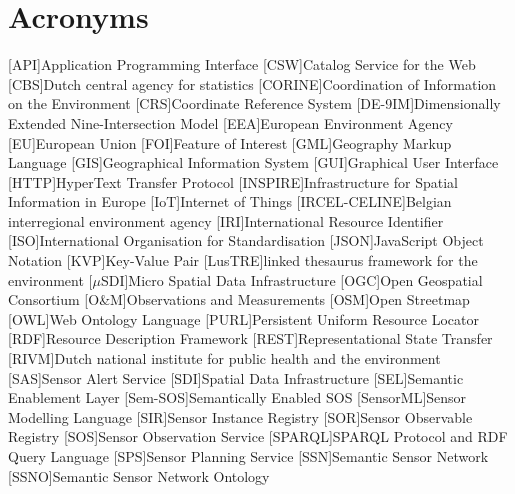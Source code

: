 \chapter*{Acronyms}

\begin{acronym}[UML]
  [API]{Application Programming Interface}
  [CSW]{Catalog Service for the Web}
  [CBS]{Dutch central agency for statistics}
  [CORINE]{Coordination of Information on the Environment} 
  [CRS]{Coordinate Reference System} 
  [DE-9IM]{Dimensionally Extended Nine-Intersection Model}
  [EEA]{European Environment Agency}
  [EU]{European Union}
  [FOI]{Feature of Interest}
  [GML]{Geography Markup Language}
  [GIS]{Geographical Information System}
  [GUI]{Graphical User Interface}
  [HTTP]{HyperText Transfer Protocol}
  [INSPIRE]{Infrastructure for Spatial Information in Europe}
  [IoT]{Internet of Things}
  [IRCEL-CELINE]{Belgian interregional environment agency}
  [IRI]{International Resource Identifier}
  [ISO]{International Organisation for Standardisation}
  [JSON]{JavaScript Object Notation}
  [KVP]{Key-Value Pair}
  [LusTRE]{linked thesaurus framework for the environment} 
  [$\mu$SDI]{Micro Spatial Data Infrastructure}
  [OGC]{Open Geospatial Consortium}
  [O\&M]{Observations and Measurements}
  [OSM]{Open Streetmap}
  [OWL]{Web Ontology Language}
  [PURL]{Persistent Uniform Resource Locator}
  [RDF]{Resource Description Framework}
  [REST]{Representational State Transfer}
  [RIVM]{Dutch national institute for public health and the environment}
  [SAS]{Sensor Alert Service}
  [SDI]{Spatial Data Infrastructure}
  [SEL]{Semantic Enablement Layer}
  [Sem-SOS]{Semantically Enabled SOS}
  [SensorML]{Sensor Modelling Language}
  [SIR]{Sensor Instance Registry}
  [SOR]{Sensor Observable Registry}
  [SOS]{Sensor Observation Service}
  [SPARQL]{SPARQL Protocol and RDF Query Language}
  [SPS]{Sensor Planning Service}
  [SSN]{Semantic Sensor Network}
  [SSNO]{Semantic Sensor Network Ontology}

\end{acronym}
